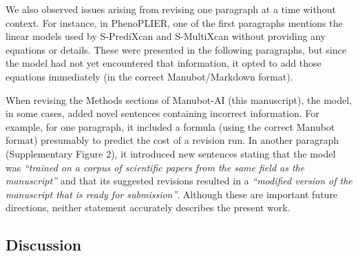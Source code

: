 \documentclass[
]{article}
\begin{document}
We also observed issues arising from revising one paragraph at a time without context.
For instance, in PhenoPLIER, one of the first paragraphs mentions the linear models used by S-PrediXcan and S-MultiXcan without providing any equations or details.
These were presented in the following paragraphs, but since the model had not yet encountered that information, it opted to add those equations immediately (in the correct Manubot/Markdown format).

% 

When revising the Methods sections of Manubot-AI (this manuscript), the model, in some cases, added novel sentences containing incorrect information.
For example, for one paragraph, it included a formula (using the correct Manubot format) presumably to predict the cost of a revision run.
In another paragraph (Supplementary Figure 2), it introduced new sentences stating that the model was \emph{``trained on a corpus of scientific papers from the same field as the manuscript''} and that its suggested revisions resulted in a \emph{``modified version of the manuscript that is ready for submission''}.
Although these are important future directions, neither statement accurately describes the present work.

\hypertarget{discussion}{%
\subsection{Discussion}\label{discussion}}
\end{document}
